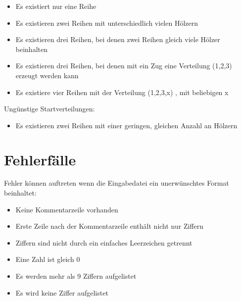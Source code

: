 \begin{itemize}
\item{Es existiert nur eine Reihe}
\item{Es existieren zwei Reihen mit unterschiedlich vielen Hölzern}
\item{Es existieren drei Reihen, bei denen zwei Reihen gleich viele Hölzer beinhalten}
\item{Es existieren drei Reihen, bei denen mit ein Zug eine Verteilung (1,2,3) erzeugt
werden kann}
\item{Es existiere vier Reihen mit der Verteilung (1,2,3,x) , mit beliebigen x}
\end{itemize}



Ungünstige Startverteilungen:

\begin{itemize}
\item{Es existieren zwei Reihen mit einer geringen, gleichen Anzahl an Hölzern}
\end{itemize}



\section{Fehlerfälle}
Fehler können auftreten wenn die Eingabedatei ein unerwünschtes Format beinhaltet:
\begin{itemize}
\item{Keine Kommentarzeile vorhanden}
\item{Erste Zeile nach der Kommentarzeile enthält nicht nur Ziffern}
\item{Ziffern sind nicht durch ein einfaches Leerzeichen getrennt}
\item{Eine Zahl ist gleich 0}
\item{Es werden mehr als 9 Ziffern aufgelistet}
\item{Es wird keine Ziffer aufgelistet}
\end{itemize}

